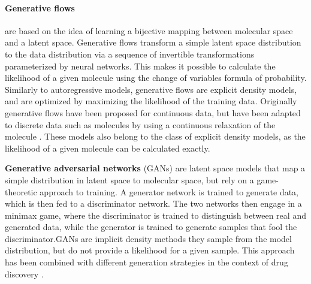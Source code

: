 \paragraph{Generative flows} \citep{rezendeVariationalInferenceNormalizing2016} are based on the
idea of learning a bijective mapping between molecular space and a latent space. Generative flows
transform a simple latent space distribution to the data distribution via a sequence of invertible
transformations parameterized by neural networks. This makes it possible to calculate the likelihood
of a given molecule using the change of variables formula of probability. Similarly to
autoregressive models, generative flows are explicit density models, and are optimized by maximizing
the likelihood of the training data. Originally generative flows have been proposed for continuous
data, but have been adapted to discrete data such as molecules by using a continuous relaxation of
the molecule \citep{madhawaGraphNVPInvertibleFlow2019}. These models also belong to the class of
explicit density models, as the likelihood of a given molecule can be calculated exactly.

\textbf{Generative adversarial networks} (GANs) \citep{goodfellowGenerativeAdversarialNetworks2014}
are latent space models that map a simple distribution in latent space to molecular space, but rely
on a game-theoretic approach to training. A generator network is trained to generate data, which is
then fed to a discriminator network. The two networks then engage in a minimax game, where the
discriminator is trained to distinguish between real and generated data, while the generator is
trained to generate samples that fool the discriminator.\@ GANs are implicit density methods they
sample from the model distribution, but do not provide a likelihood for a given sample. This
approach has been combined with different generation strategies in the context of drug discovery
\citep{decaoMolGANImplicitGenerative2018,kadurinDruGANAdvancedGenerative2017,guimaraesObjectiveReinforcedGenerativeAdversarial2017,mendez-lucioNovoGenerationHitlike2018,tangMolecularGenerativeAdversarial2024}.

